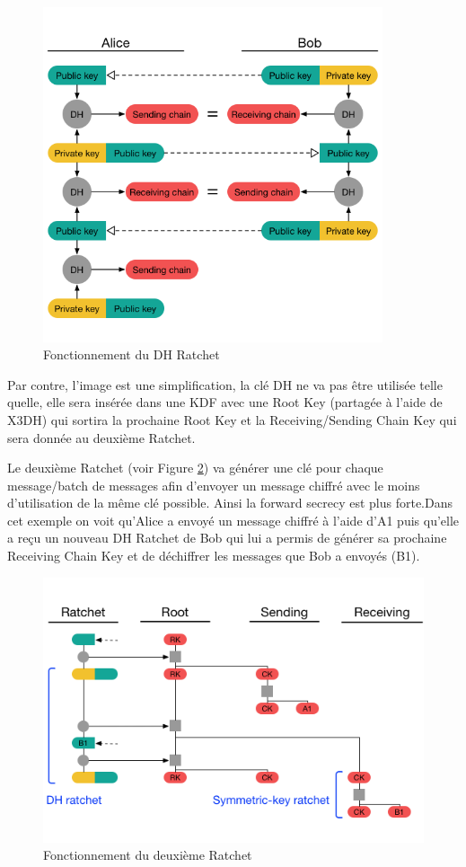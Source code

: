 \begin{figure}[h!]
	\centering
	\includegraphics[width=10cm]{images/signalFonctionnement.png}
	\caption{Fonctionnement du DH Ratchet~\cite{doubleratchet}}
	\label{fig:signal}
\end{figure}

Par contre, l'image est une simplification, la clé DH ne va pas être utilisée telle quelle, elle sera insérée dans une KDF avec une Root Key (partagée à l'aide de X3DH) qui sortira la prochaine Root Key et la Receiving/Sending Chain Key qui sera donnée au deuxième Ratchet.

Le deuxième Ratchet (voir Figure \ref{fig:signalSecond}) va générer une clé pour chaque message/batch de messages afin d'envoyer un message chiffré avec le moins d'utilisation de la même clé possible. Ainsi la forward secrecy est plus forte.Dans cet exemple on voit qu'Alice a envoyé un message chiffré à l'aide d'A1 puis qu'elle a reçu un nouveau DH Ratchet de Bob qui lui a permis de générer sa prochaine Receiving Chain Key et de déchiffrer les messages que Bob a envoyés (B1).

\begin{figure}[h!]
	\centering
	\includegraphics[width=12cm]{images/secondRatchet.png}
	\caption{Fonctionnement du deuxième Ratchet~\cite{doubleratchet}}
	\label{fig:signalSecond}
\end{figure}

